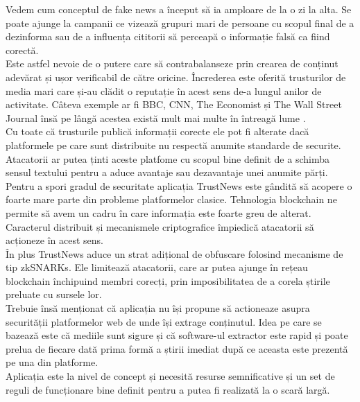 Vedem cum conceptul de fake news a început să ia amploare de la o zi la alta. Se poate ajunge la campanii ce vizează grupuri mari de persoane cu scopul final de a dezinforma sau de a influența cititorii să perceapă o informație falsă ca fiind corectă.\\

Este astfel nevoie de o putere care să contrabalanseze prin crearea de conținut adevărat și ușor verificabil de către oricine. Încrederea este oferită trusturilor de media mari care și-au clădit o reputație în acest sens de-a lungul anilor de activitate. Câteva exemple ar fi BBC, CNN, The Economist și The Wall Street Journal însă pe lângă acestea există mult mai multe în întreagă lume \cite{FakeNews_TrustedSites}.\\

Cu toate că trusturile publică informații corecte ele pot fi alterate dacă platformele pe care sunt distribuite nu respectă anumite standarde de securite. Atacatorii ar putea ținti aceste platfome cu scopul bine definit de a schimba sensul textului pentru a aduce avantaje sau dezavantaje unei anumite părți.\\

Pentru a spori gradul de securitate aplicația TrustNews este gândită să acopere o foarte mare parte din probleme platformelor clasice. Tehnologia blockchain ne permite să avem un cadru în care informația este foarte greu de alterat. Caracterul distribuit și mecanismele criptografice împiedică atacatorii să acționeze în acest sens.\\

În plus TrustNews aduce un strat adițional de obfuscare folosind mecanisme de tip zkSNARKs. Ele limitează atacatorii, care ar putea ajunge în rețeau blockchain închipuind membri corecți, prin imposibilitatea de a corela știrile preluate cu sursele lor.\\

Trebuie însă menționat că aplicația nu își propune să actioneaze asupra securității platformelor web de unde își extrage conținutul. Idea pe care se bazează este că mediile sunt sigure și că software-ul extractor este rapid și poate prelua de fiecare dată prima formă a știrii imediat după ce aceasta este prezentă pe una din platforme.\\

Aplicația este la nivel de concept și necesită resurse semnificative și un set de reguli de funcționare bine definit pentru a putea fi realizată la o scară largă.\\
